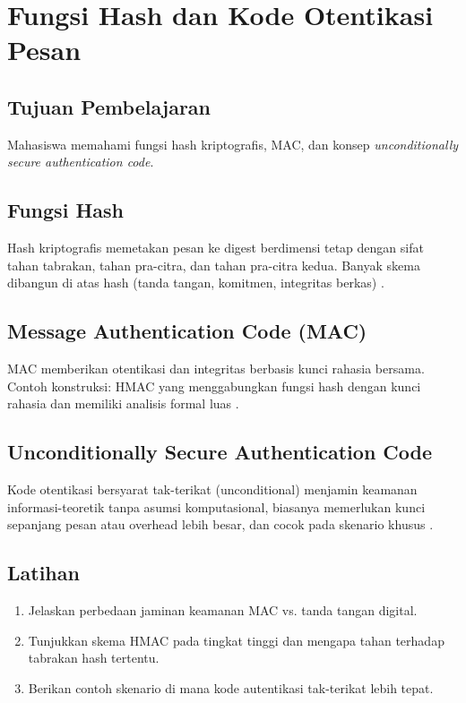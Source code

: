 \documentclass[../main.tex]{subfiles}
\begin{document}
\chapter{Fungsi Hash dan Kode Otentikasi Pesan}

\section{Tujuan Pembelajaran}
Mahasiswa memahami fungsi hash kriptografis, MAC, dan konsep \emph{unconditionally secure authentication code}.

\section{Fungsi Hash}
Hash kriptografis memetakan pesan ke digest berdimensi tetap dengan sifat tahan tabrakan, tahan pra-citra, dan tahan pra-citra kedua. Banyak skema dibangun di atas hash (tanda tangan, komitmen, integritas berkas) \citep{menezes}.

\section{Message Authentication Code (MAC)}
MAC memberikan otentikasi dan integritas berbasis kunci rahasia bersama. Contoh konstruksi: HMAC yang menggabungkan fungsi hash dengan kunci rahasia dan memiliki analisis formal luas \citep{katzlindell}.

\section{Unconditionally Secure Authentication Code}
Kode otentikasi bersyarat tak-terikat (unconditional) menjamin keamanan informasi-teoretik tanpa asumsi komputasional, biasanya memerlukan kunci sepanjang pesan atau overhead lebih besar, dan cocok pada skenario khusus \citep{menezes}.

\section{Latihan}
\begin{enumerate}
  \item Jelaskan perbedaan jaminan keamanan MAC vs. tanda tangan digital.
  \item Tunjukkan skema HMAC pada tingkat tinggi dan mengapa tahan terhadap tabrakan hash tertentu.
  \item Berikan contoh skenario di mana kode autentikasi tak-terikat lebih tepat.
\end{enumerate}
\end{document}

